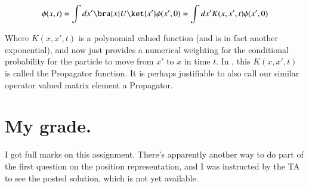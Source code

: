 \begin{align*}
\phi(x,t) = \int dx' \bra{x} U \ket{x'} \phi(x',0) = \int dx' K(x,x',t) \phi(x',0) 
\end{align*}

Where $K(x,x',t)$ is a polynomial valued function (and is in fact another exponential), and now just provides a numerical weighting for the conditional probability for the particle to move from $x'$ to $x$ in time $t$.  In \cite{liboff2003iqm}, this $K(x,x',t)$ is called the Propagator function.  It is perhaps justifiable to also call our similar operator valued matrix element a Propagator.

%
%

\section{My grade.}

I got full marks on this assignment.  There's apparently another way to do part of the first question on the position representation, and I was instructed by the TA to see the posted solution, which is not yet available.

\EndArticle

